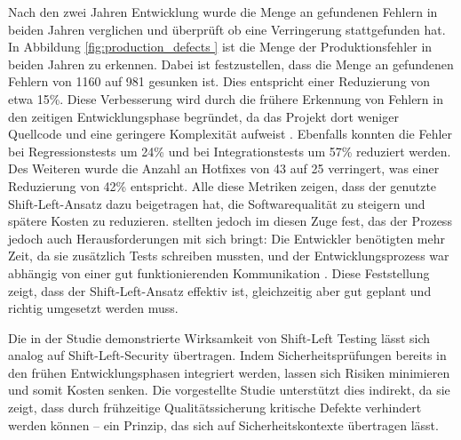 Nach den zwei Jahren Entwicklung wurde die Menge an gefundenen Fehlern in beiden Jahren verglichen und überprüft ob eine Verringerung stattgefunden hat. In Abbildung \ref{fig:production_defects } ist die Menge der Produktionsfehler in beiden Jahren zu erkennen. Dabei ist festzustellen, dass die Menge an gefundenen Fehlern von 1160 auf 981 gesunken ist. Dies entspricht einer Reduzierung von etwa 15\%. Diese Verbesserung wird durch die frühere Erkennung von Fehlern in den zeitigen Entwicklungsphase begründet, da das Projekt dort weniger Quellcode und eine geringere Komplexität aufweist \cite{andriadi_impact_2023}. Ebenfalls konnten die Fehler bei Regressionstests um 24\% und bei Integrationstests um 57\% reduziert werden. Des Weiteren wurde die Anzahl an Hotfixes von 43 auf 25 verringert, was einer Reduzierung von 42\% entspricht. Alle diese Metriken zeigen, dass der genutzte Shift-Left-Ansatz dazu beigetragen hat, die Softwarequalität zu steigern und spätere Kosten zu reduzieren. \citet{andriadi_impact_2023} stellten jedoch im diesen Zuge fest, das der Prozess jedoch auch Herausforderungen mit sich bringt: Die Entwickler benötigten mehr Zeit, da sie zusätzlich Tests schreiben mussten, und der Entwicklungsprozess war abhängig von einer gut funktionierenden Kommunikation \cite{andriadi_impact_2023}. Diese Feststellung zeigt, dass der Shift-Left-Ansatz effektiv ist, gleichzeitig aber gut geplant und richtig umgesetzt werden muss.

Die in der Studie demonstrierte Wirksamkeit von Shift-Left Testing lässt sich analog auf Shift-Left-Security übertragen. Indem Sicherheitsprüfungen bereits in den frühen Entwicklungsphasen integriert werden, lassen sich Risiken minimieren und somit Kosten senken. Die vorgestellte Studie unterstützt dies indirekt, da sie zeigt, dass durch frühzeitige Qualitätssicherung kritische Defekte verhindert werden können – ein Prinzip, das sich auf Sicherheitskontexte übertragen lässt.